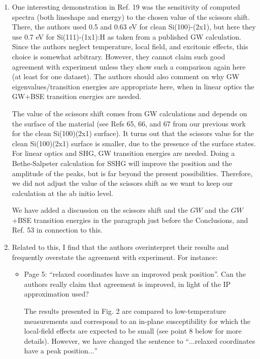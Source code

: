 \documentclass[11pt]{article}
\begin{document}
\begin{enumerate}

\item
One interesting demonstration in Ref. 19 was the sensitivity of computed spectra
(both lineshape and energy) to the chosen value of the scissors shift. There,
the authors used 0.5 and 0.63 eV for clean Si(100)-(2x1), but here they use 0.7
eV for Si(111)-(1x1):H as taken from a published GW calculation. Since the
authors neglect temperature, local field, and excitonic effects, this choice is
somewhat arbitrary. However, they cannot claim such good agreement with
experiment unless they show such a comparison again here (at least for one
dataset). The authors should also comment on why GW eigenvalues/transition
energies are appropriate here, when in linear optics the GW+BSE transition
energies are needed.
\begin{shaded}\label{ref1.01}
The value of the scissors shift comes from GW calculations and depends on the
surface of the material (see Refs 65, 66, and 67 from our previous work for the
clean Si(100)(2x1) surface). It turns out that the scissors value for the clean
Si(100)(2x1) surface is smaller, due to the presence of the surface states. For
linear optics and SHG, GW transition energies are needed. Doing a Bethe-Salpeter
calculation for SSHG will improve the position and the amplitude of the peaks,
but is far beyond the present possibilities. Therefore, we did not adjust the
value of the scissors shift as we want to keep our calculation at the ab initio
level.

We have added a discussion on the scissors shift and the $GW$ and the $GW$+BSE
transition energies in the paragraph just before the Conclusions, and Ref. 53 in
connection to this.
\end{shaded}

\item
Related to this, I find that the authors overinterpret their results and
frequently overstate the agreement with experiment. For instance:

\begin{itemize}

\item 
Page 5: ``relaxed coordinates have an improved peak position''. Can the authors
really claim that agreement is improved, in light of the IP approximation used?
\begin{shaded}\label{ref1.02}
The results presented in Fig. 2 are compared to low-temperature measurements and
correspond to an in-plane susceptibility for which the local-field effects are
expected to be small (see point 8 below for more details). However, we have
changed the sentence to ``$\dots$relaxed coordinates have a peak
position$\dots$''
\end{shaded}


\end{itemize}
\end{enumerate}
\end{document}
